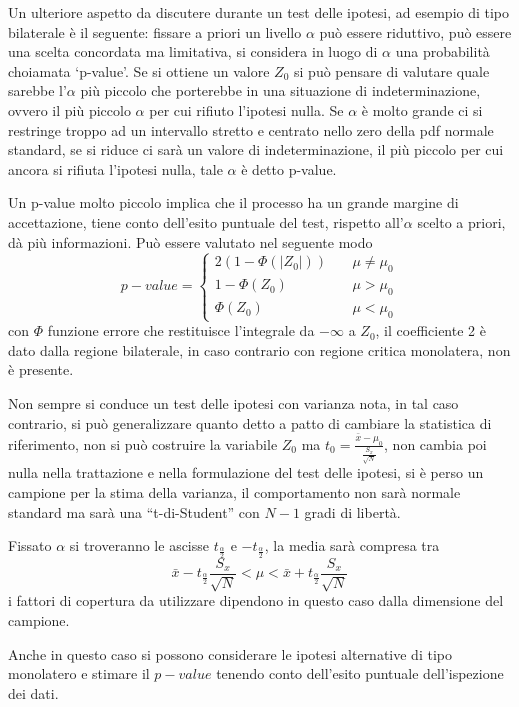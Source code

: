 Un ulteriore aspetto da discutere durante un test delle ipotesi, ad esempio di tipo bilaterale è il seguente:
fissare a priori un livello $\alpha$ può essere riduttivo, può essere  una scelta concordata ma limitativa, si considera in luogo di $\alpha$ una probabilità choiamata `p-value'.
Se si ottiene un valore $Z_0$ si può pensare di valutare quale sarebbe l'$\alpha$ più piccolo che  porterebbe in una situazione di indeterminazione, ovvero il più piccolo $\alpha$ per cui rifiuto l'ipotesi nulla.
Se $\alpha$ è molto grande ci si restringe troppo ad un intervallo stretto e centrato nello zero della pdf normale standard, se si riduce ci sarà un valore di indeterminazione, il più piccolo per cui ancora si rifiuta l'ipotesi nulla, tale $\alpha$ è detto p-value.

Un p-value molto piccolo implica che il processo ha un grande margine di accettazione, tiene conto dell'esito puntuale del test, rispetto all'$\alpha$ scelto a priori, dà più informazioni. Può essere valutato nel seguente modo
$$
p-value = \begin{cases}
    2(1-\Phi(|Z_0|)) &\quad \mu\neq\mu_0 \\
    1-\Phi(Z_0) & \quad \mu > \mu_0 \\
    \Phi(Z_0) & \quad \mu<\mu_0
\end{cases}
$$
con $\Phi$ funzione errore che restituisce l'integrale da $-\infty$ a $Z_0$, il coefficiente 2 è dato dalla regione bilaterale, in caso contrario con regione critica monolatera, non è presente.

Non sempre si conduce un test delle ipotesi con varianza nota, in tal caso 
contrario, si può generalizzare quanto detto a patto di cambiare la statistica 
di riferimento, non si può costruire la variabile $Z_0$ ma $t_0 = \frac{\bar{x}-\mu_0}{\frac{S_x}{\sqrt{N}}}$, non cambia poi nulla nella trattazione e nella 
formulazione del test delle ipotesi, si è perso un campione per la stima della 
varianza, il comportamento non sarà normale standard ma sarà una ``t-di-Student'' con $N-1$ gradi di libertà.

Fissato $\alpha$ si troveranno le ascisse $t_\frac{\alpha}{2}$ e
$-t_\frac{\alpha}{2}$, la media sarà compresa tra 
$$
\bar{x} - t_\frac{\alpha}{2}\frac{S_x}{\sqrt{N}} < \mu < \bar{x} + t_\frac{\alpha}{2} \frac{S_x}{\sqrt{N}}
$$
i fattori di copertura da utilizzare dipendono in questo caso dalla dimensione del campione.

Anche in questo caso si possono considerare le ipotesi alternative di tipo monolatero e stimare il $p-value$ tenendo conto dell'esito puntuale dell'ispezione dei dati.

